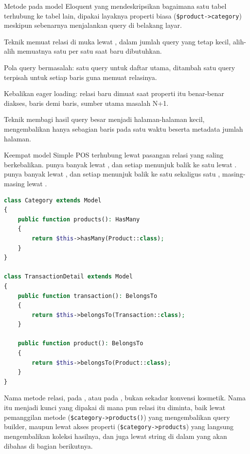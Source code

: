 \begin{istilahpenting}
\begin{description}[leftmargin=0pt,style=nextline]
  \item[Relasi] Metode pada model Eloquent yang mendeskripsikan bagaimana satu tabel terhubung ke tabel lain, dipakai layaknya properti biasa (\texttt{\$product->category}) meskipun sebenarnya menjalankan query di belakang layar.
  \item[Eager Loading] Teknik memuat relasi di muka lewat , dalam jumlah query yang tetap kecil, alih-alih memuatnya satu per satu saat baru dibutuhkan.
  \item[N+1] Pola query bermasalah: satu query untuk daftar utama, ditambah satu query terpisah untuk setiap baris guna memuat relasinya.
  \item[Lazy Loading] Kebalikan eager loading: relasi baru dimuat saat properti itu benar-benar diakses, baris demi baris, sumber utama masalah N+1.
  \item[Paginasi] Teknik membagi hasil query besar menjadi halaman-halaman kecil, mengembalikan hanya sebagian baris pada satu waktu beserta metadata jumlah halaman.
\end{description}
\end{istilahpenting}

Keempat model Simple POS terhubung lewat pasangan relasi yang saling
berkebalikan.  punya banyak 
lewat , dan setiap  menunjuk balik
ke satu  lewat .
 punya banyak  lewat
, dan setiap  menunjuk
balik ke satu  sekaligus satu ,
masing-masing lewat .

\begin{lstlisting}[language=php]
class Category extends Model
{
    public function products(): HasMany
    {
        return $this->hasMany(Product::class);
    }
}

class TransactionDetail extends Model
{
    public function transaction(): BelongsTo
    {
        return $this->belongsTo(Transaction::class);
    }

    public function product(): BelongsTo
    {
        return $this->belongsTo(Product::class);
    }
}
\end{lstlisting}

Nama metode relasi,  pada , atau
 pada , bukan sekadar
konvensi kosmetik. Nama itu menjadi kunci yang dipakai di mana pun
relasi itu diminta, baik lewat pemanggilan metode
(\texttt{\$category->products()}) yang mengembalikan query builder, maupun
lewat akses properti (\texttt{\$category->products}) yang langsung
mengembalikan koleksi hasilnya, dan juga lewat string di dalam
 yang akan dibahas di bagian berikutnya.


